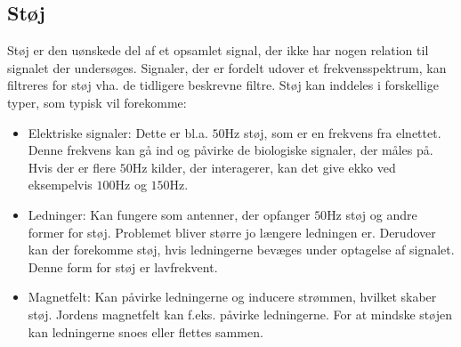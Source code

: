 \subsection{Støj}\label{StoejAfsnit}
Støj er den uønskede del af et opsamlet signal, der ikke har nogen relation til signalet der undersøges. Signaler, der er fordelt udover et frekvensspektrum, kan filtreres for støj vha. de tidligere beskrevne filtre. \cite{Devasahayam2000,Wolf2004}
Støj kan inddeles i forskellige typer, som typisk vil forekomme:

\begin{itemize}
\item Elektriske signaler: Dette er bl.a. $50$Hz støj, som er en frekvens fra elnettet. Denne frekvens kan gå ind og påvirke de biologiske signaler, der måles på. Hvis der er flere $50$Hz kilder, der interagerer, kan det give ekko ved eksempelvis $100$Hz og $150$Hz. 
\item Ledninger: Kan fungere som antenner, der opfanger $50$Hz støj og andre former for støj. Problemet bliver større jo længere ledningen er. Derudover kan der forekomme støj, hvis ledningerne bevæges under optagelse af signalet. Denne form for støj er lavfrekvent. \cite{webster2009}
\item Magnetfelt: Kan påvirke ledningerne og inducere strømmen, hvilket skaber støj. Jordens magnetfelt kan f.eks. påvirke ledningerne. For at mindske støjen kan ledningerne snoes eller flettes sammen. \cite{Wolf2004}
\end{itemize} 